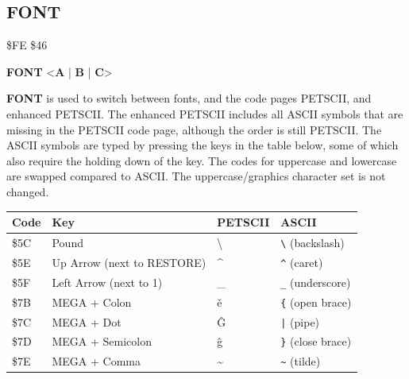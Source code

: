 \subsection{FONT}
\begin{description}[leftmargin=2cm,style=nextline]
\item [Token:] \$FE \$46
\item [Format:] {\bf FONT} <{\bf A} | {\bf B} | {\bf C}>
\item [Usage:] {\bf FONT} is used to switch between fonts,
               and the code pages PETSCII, and enhanced PETSCII.
               The enhanced PETSCII includes all ASCII symbols that
               are missing in the PETSCII code page, although the order
               is still PETSCII.
               The ASCII symbols are typed by pressing the keys in the table below,
               some of which also require the holding down of the \megasymbolkey key.
               The codes for uppercase and lowercase
               are swapped compared to ASCII.
               The uppercase/graphics character set is not changed.
\begin{center}
{\setlength{\tabcolsep}{1mm}
  \begin{tabular}{|C{1cm}|L{4.5cm}|C{1.4cm}|L{2.3cm}|}
\hline
{\bf Code}  & {\bf Key} & {\bf PETSCII} & {\bf ASCII}  \\
\hline
    \$5C & Pound      & {\codefont \textbackslash}   & {\tt \textbackslash} (backslash) \\
    \$5E & Up Arrow (next to RESTORE)  & {\codefont \textasciicircum} & {\tt \textasciicircum} (caret) \\
    \$5F & Left Arrow (next to 1)      & {\codefont \_}               & {\tt \_} (underscore)   \\
    \$7B & MEGA + Colon                & {\codefont ě }               & {\tt \{} (open brace)   \\
    \$7C & MEGA + Dot                  & {\codefont Ĝ }               & {\tt |} (pipe)  \\
    \$7D & MEGA + Semicolon            & {\codefont ĝ }               & {\tt \}} (close brace)  \\
    \$7E & MEGA + Comma                & {\codefont \textasciitilde}  & {\tt \textasciitilde} (tilde)   \\
\hline
\end{tabular}
}
\end{center}

%
%
%


\end{description}
